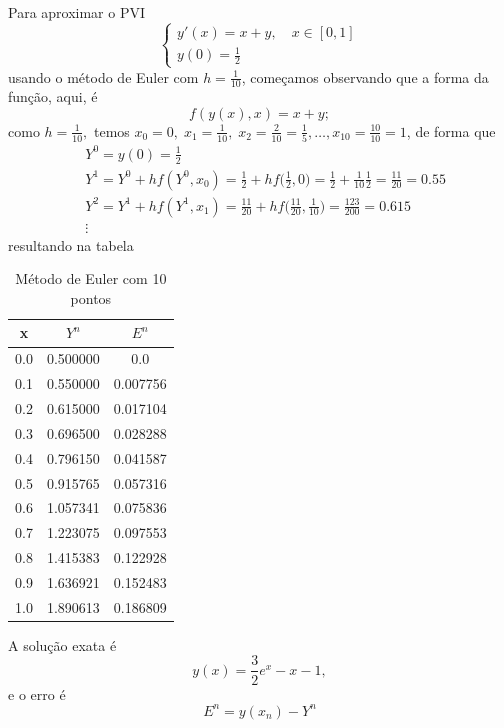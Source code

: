 \documentclass[../differential_methods.tex]{subfiles}
\begin{document}
\begin{example}
	Para aproximar o PVI
	\[
		\left\{\begin{array}{ll}
			y'(x) = x + y, \quad x\in [0, 1] \\
			y(0) = \frac{1}{2}
		\end{array}\right.
	\]
	usando o método de Euler com \(h=\frac{1}{10}\), começamos observando que a forma da função, aqui, é
	\[
		f(y(x), x) = x+y;
	\]
	como \(h = \frac{1}{10},\) temos \(x_{0} = 0,\; x_1 = \frac{1}{10},\; x_2 = \frac{2}{10} = \frac{1}{5}, \dotsc , x_10 = \frac{10}{10}=1\), de forma que
	\begin{align*}
		 & Y^{0} = y(0) = \frac{1}{2}                                                                                                              \\
		 & Y^{1} = Y^{0}+hf(Y^{0}, x_{0}) = \frac{1}{2}+hf\biggl(\frac{1}{2}, 0\biggr)= \frac{1}{2}+\frac{1}{10}\frac{1}{2} = \frac{11}{20} = 0.55 \\
		 & Y^{2} = Y^{1} + h f(Y^{1}, x_1) = \frac{11}{20}+hf\biggl(\frac{11}{20}, \frac{1}{10}\biggr) = \frac{123}{200} = 0.615                   \\
		 & \vdots
	\end{align*}
	resultando na tabela
	\begin{table}[H]
		\centering
		\caption{Método de Euler com 10 pontos}
		\begin{tabular}{| c | c | c |}
			\hline
			x   & \(Y^{n}\) & \(E^{n}\) \\
			\hline
			0.0 & 0.500000  & 0.0       \\
			0.1 & 0.550000  & 0.007756  \\
			0.2 & 0.615000  & 0.017104  \\
			0.3 & 0.696500  & 0.028288  \\
			0.4 & 0.796150  & 0.041587  \\
			0.5 & 0.915765  & 0.057316  \\
			0.6 & 1.057341  & 0.075836  \\
			0.7 & 1.223075  & 0.097553  \\
			0.8 & 1.415383  & 0.122928  \\
			0.9 & 1.636921  & 0.152483  \\
			1.0 & 1.890613  & 0.186809  \\
			\hline
		\end{tabular}
	\end{table}
	A solução exata é
	\[
		y(x) = \frac{3}{2}e^{x}-x-1,
	\]
	e o erro é
	\[
		E^{n} = y(x_{n})-Y^{n}
	\]
\end{example}
\end{document}
